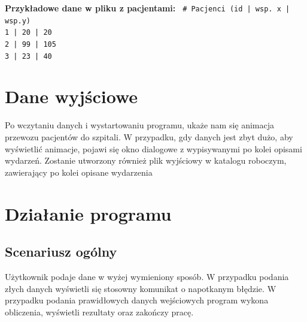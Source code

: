 \documentclass{article}
\begin{document}
{\textbf{Przykładowe dane w pliku z pacjentami:}
\newline
\newline
{\fontsize{10}{10}\selectfont 
\texttt{
\# Pacjenci (id | wsp. x | wsp.y)\\
1 | 20 | 20\\
2 | 99 | 105\\
3 | 23 | 40\\
}
}
}
\section{Dane wyjściowe}
{\fontsize{14}{14}\selectfont 
Po wczytaniu danych i wystartowaniu programu, ukaże nam się animacja przewozu pacjentów do szpitali. W przypadku, gdy danych jest zbyt dużo, aby wyświetlić animacje, pojawi się okno dialogowe z wypisywanymi po kolei opisami wydarzeń. 
Zostanie utworzony również plik wyjściowy w katalogu roboczym, zawierający po kolei opisane wydarzenia 
\newline}

\section{Działanie programu}
\subsection{Scenariusz ogólny}
{\fontsize{14}{14}\selectfont 
Użytkownik podaje dane w wyżej wymieniony sposób. W przypadku podania złych danych wyświetli się stosowny komunikat o napotkanym błędzie.
\newline 
W przypadku podania prawidłowych danych wejściowych program wykona obliczenia, wyświetli rezultaty oraz zakończy pracę. 
\newline}
\end{document}
